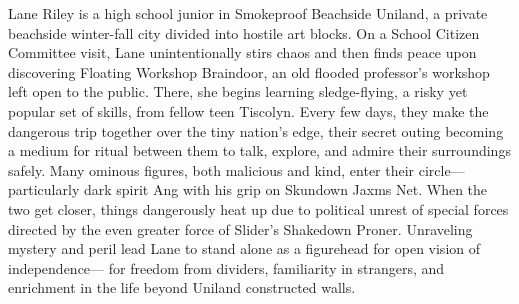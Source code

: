  

Lane Riley is a high school junior in Smokeproof Beachside Uniland, a private beachside winter-fall city divided into hostile art blocks. On a School Citizen Committee visit, Lane unintentionally stirs chaos and then finds peace upon discovering Floating Workshop Braindoor, an old flooded professor’s workshop left open to the public. There, she begins learning sledge-flying, a risky yet popular set of skills, from fellow teen Tiscolyn. Every few days, they make the dangerous trip together over the tiny nation’s edge, their secret outing becoming a medium for ritual between them to talk, explore, and admire their surroundings safely. Many ominous figures, both malicious and kind, enter their circle— particularly dark spirit Ang with his grip on Skundown Jaxms Net. When the two get closer, things dangerously heat up due to political unrest of special forces directed by the even greater force of Slider’s Shakedown Proner. Unraveling mystery and peril lead Lane to stand alone as a figurehead for open vision of independence— for freedom from dividers, familiarity in strangers, and enrichment in the life beyond Uniland constructed walls.